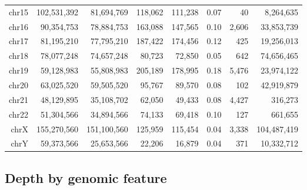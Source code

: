 \documentclass{article}
\begin{document}
\begin{center}
{\begin{longtable}{|r|r|r|r|r|r|r|r|}
  chr15 & 102,531,392 &  81,694,769 & 118,062 & 111,238 & 0.07 &    40 &   8,264,635 \\ 
   \rowcolor[gray]{0.9}chr16 &  90,354,753 &  78,884,753 & 163,088 & 147,565 & 0.10 & 2,606 &  33,853,739 \\ 
  chr17 &  81,195,210 &  77,795,210 & 187,422 & 174,456 & 0.12 &   425 &  19,256,013 \\ 
   \rowcolor[gray]{0.9}chr18 &  78,077,248 &  74,657,248 &  80,723 &  72,850 & 0.05 &   642 &  74,656,465 \\ 
  chr19 &  59,128,983 &  55,808,983 & 205,189 & 178,995 & 0.18 & 5,476 &  23,974,122 \\ 
   \rowcolor[gray]{0.9}chr20 &  63,025,520 &  59,505,520 &  95,767 &  89,570 & 0.08 &   102 &  42,919,879 \\ 
  chr21 &  48,129,895 &  35,108,702 &  62,050 &  49,433 & 0.08 & 4,427 &     316,273 \\ 
   \rowcolor[gray]{0.9}chr22 &  51,304,566 &  34,894,566 &  74,133 &  69,418 & 0.10 &   127 &     661,655 \\ 
  chrX & 155,270,560 & 151,100,560 & 125,959 & 115,454 & 0.04 & 3,338 & 104,487,419 \\ 
   \rowcolor[gray]{0.9}chrY &  59,373,566 &  25,653,566 &  22,206 &  16,879 & 0.04 &   371 &  10,332,712 \\ 
   \hline
\hline
\end{longtable}
}\end{center}

\subsection{Depth by genomic feature}
\end{document}
